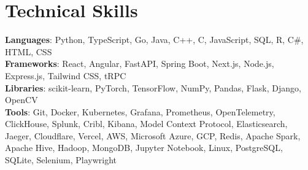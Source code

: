 \documentclass[letterpaper,11pt]{article}
\begin{document}
\section{Technical Skills}
 \begin{itemize}[leftmargin=0.15in, label={}]
    \small{\item{
     \textbf{Languages}{: Python, TypeScript, Go, Java, C++, C, JavaScript, SQL, R, C\#, HTML, CSS} \\
     \textbf{Frameworks}{: React, Angular, FastAPI, Spring Boot, Next.js, Node.js, Express.js, Tailwind CSS, tRPC} \\
     \textbf{Libraries}{: scikit-learn, PyTorch, TensorFlow, NumPy, Pandas, Flask, Django, OpenCV} \\
     \textbf{Tools}{: Git, Docker, Kubernetes, Grafana, Prometheus, OpenTelemetry, ClickHouse, Splunk, Cribl, Kibana, Model Context Protocol, Elasticsearch, Jaeger, Cloudflare, Vercel, AWS, Microsoft Azure, GCP, Redis, Apache Spark, Apache Hive, Hadoop, MongoDB, Jupyter Notebook, Linux, PostgreSQL, SQLite, Selenium, Playwright} \\
    }}
 \end{itemize}
\end{document}
